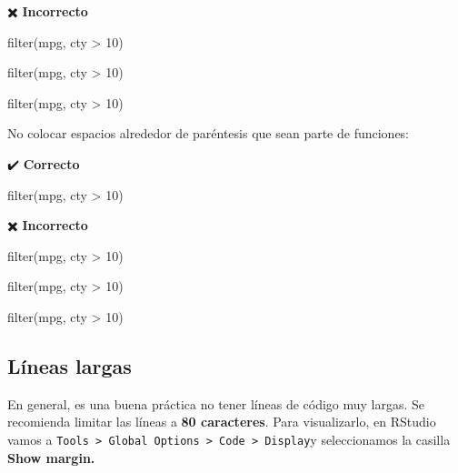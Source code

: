 \documentclass[
  spanish,
  letterpaper,
  DIV=11,
  numbers=noendperiod]{scrreprt}
\newenvironment{Shaded}{\begin{snugshade}}{\end{snugshade}}
\newcommand{\DecValTok}[1]{\textcolor[rgb]{0.68,0.00,0.00}{#1}}
\newcommand{\FunctionTok}[1]{\textcolor[rgb]{0.28,0.35,0.67}{#1}}
\newcommand{\NormalTok}[1]{\textcolor[rgb]{0.00,0.23,0.31}{#1}}
\newcommand{\SpecialCharTok}[1]{\textcolor[rgb]{0.37,0.37,0.37}{#1}}
\begin{document}
✖️ \textbf{Incorrecto}

\begin{Shaded}
\begin{Highlighting}[]
\FunctionTok{filter}\NormalTok{(mpg, cty }\SpecialCharTok{\textgreater{}} \DecValTok{10}\NormalTok{)}

\FunctionTok{filter}\NormalTok{(mpg, cty }\SpecialCharTok{\textgreater{}} \DecValTok{10}\NormalTok{)}

\FunctionTok{filter}\NormalTok{(mpg, cty }\SpecialCharTok{\textgreater{}} \DecValTok{10}\NormalTok{)}
\end{Highlighting}
\end{Shaded}

No colocar espacios alrededor de paréntesis que sean parte de funciones:

✔️ \textbf{Correcto}

\begin{Shaded}
\begin{Highlighting}[]
\FunctionTok{filter}\NormalTok{(mpg, cty }\SpecialCharTok{\textgreater{}} \DecValTok{10}\NormalTok{)}
\end{Highlighting}
\end{Shaded}

✖️ \textbf{Incorrecto}

\begin{Shaded}
\begin{Highlighting}[]
\FunctionTok{filter}\NormalTok{(mpg, cty }\SpecialCharTok{\textgreater{}} \DecValTok{10}\NormalTok{)}

\FunctionTok{filter}\NormalTok{(mpg, cty }\SpecialCharTok{\textgreater{}} \DecValTok{10}\NormalTok{)}

\FunctionTok{filter}\NormalTok{(mpg, cty }\SpecialCharTok{\textgreater{}} \DecValTok{10}\NormalTok{)}
\end{Highlighting}
\end{Shaded}

\subsection{Líneas largas}\label{luxedneas-largas}

En general, es una buena práctica no tener líneas de código muy largas.
Se recomienda limitar las líneas a \textbf{80 caracteres}. Para
visualizarlo, en RStudio vamos a
\texttt{Tools\ \textgreater{}\ Global\ Options\ \textgreater{}\ Code\ \textgreater{}\ Display}y
seleccionamos la casilla \textbf{Show margin.}
\end{document}
